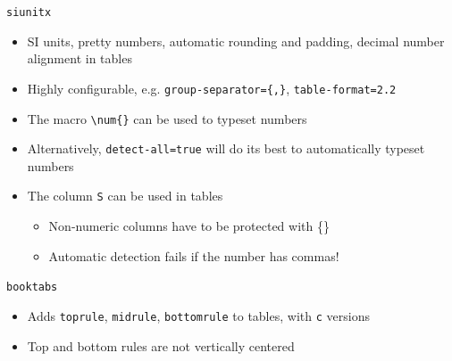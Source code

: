 \documentclass[english]{beamer}
\let\olditem\item
\renewcommand{\item}{\setlength{\itemsep}{\fill}\olditem}
\newenvironment{sitemize}{\let\item\olditem \begin{itemize}}{\vfill\end{itemize}}
\let\textttt\texttt
\renewcommand{\texttt}[1]{\colorbox{gray!10}{\textttt{#1}}}
\begin{document}
\begin{frame}[fragile]{\texttt{siunitx}}
    \begin{itemize}
        \item SI units, pretty numbers, automatic rounding and padding, decimal number alignment in tables
        \item Highly configurable, e.g. \texttt{group-separator=\{,\}}, \texttt{table-format=2.2}
        \item The macro \verb|\num{}| can be used to typeset numbers
        \item Alternatively, \texttt{detect-all=true} will do its best to automatically typeset numbers
        \item The column \texttt{S} can be used in tables
        \begin{sitemize}
            \item Non-numeric columns have to be protected with \{\}
            \item Automatic detection fails if the number has commas!
        \end{sitemize}
    \end{itemize}
\end{frame}

\begin{frame}{\texttt{booktabs}}
    \begin{itemize}
        \item Adds \texttt{toprule}, \texttt{midrule}, \texttt{bottomrule} to tables, with \texttt{c} versions
        \item Top and bottom rules are not vertically centered
    \end{itemize}
\end{frame}
\end{document}
